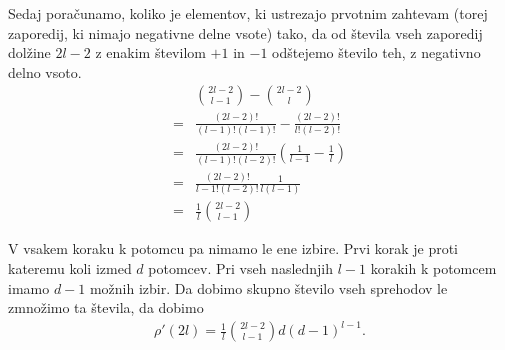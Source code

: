 \begin{dokaz}
    Sedaj poračunamo, koliko je elementov, ki ustrezajo prvotnim zahtevam (torej zaporedij, ki nimajo negativne delne vsote) tako, da od števila vseh zaporedij dolžine \(2l-2\) z enakim številom \(+1\) in \(-1\) odštejemo število teh, z negativno delno vsoto. 
    \begin{align*}
        &\binom{2l-2}{l-1} - \binom{2l-2}{l}\\
        =& \frac{(2l-2)!}{(l-1)!(l-1)!} - \frac{(2l-2)!}{l!(l-2)!}\\
        =& \frac{(2l-2)!}{(l-1)!(l-2)!}\left(\frac{1}{l-1} - \frac1l \right)\\
        =& \frac{(2l-2)!}{{l-1}!(l-2)!}\frac{1}{l(l-1)}\\
        =& \frac{1}{l}\binom{2l-2}{l-1}
    \end{align*}
    
    V vsakem koraku k potomcu pa nimamo le ene izbire. Prvi korak je proti kateremu koli izmed \(d\) potomcev. Pri vseh naslednjih \(l-1\) korakih k potomcem imamo \(d-1\) možnih izbir. Da dobimo skupno število vseh sprehodov le zmnožimo ta števila, da dobimo
    \begin{align*}
        \rho'(2l) = \frac{1}{l}\binom{2l-2}{l-1} d (d-1)^{l-1}.
    \end{align*}
\end{dokaz}
